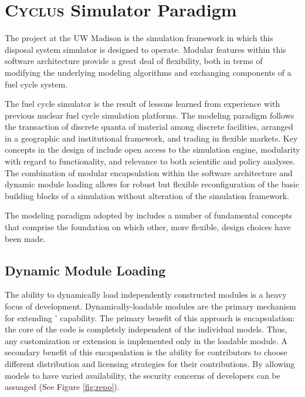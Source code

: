\section{\textsc{Cyclus} Simulator Paradigm }

The \Cyclus project \cite{wilson_cyclus:_2012} at the \gls{UW} Madison is the 
simulation framework in which this disposal system simulator is designed to 
operate.  Modular features within this software architecture provide a 
great deal of flexibility, both in terms of modifying the underlying 
modeling algorithms and exchanging components of a fuel cycle system.

The \Cyclus fuel cycle simulator is the  result of lessons learned 
from experience with previous nuclear fuel cycle simulation platforms.  
The modeling paradigm follows the transaction of discrete quanta of 
material among discrete facilities, arranged in a geographic and 
institutional framework, and trading in
flexible markets. Key concepts in the design of \Cyclus include open
access to the simulation engine, modularity with regard to
functionality, and relevance to both scientific and policy
analyses. The combination of modular encapsulation within the
software architecture and dynamic module loading allows for robust but 
flexible reconfiguration of the basic building blocks of a simulation 
without alteration of the simulation framework.  

The modeling paradigm adopted by \Cyclus includes a number of
fundamental concepts that comprise the foundation on which other, more
flexible, design choices have been made. 

\subsection{Dynamic Module Loading}

The ability to dynamically load independently constructed modules is a
heavy focus of \Cyclus development. Dynamically-loadable modules are
the primary mechanism for extending \Cyclus' capability. The primary
benefit of this approach is encapsulation: the core of the code is
completely independent of the individual models. Thus, any
customization or extension is implemented only in the loadable
module. A secondary benefit of this encapsulation is the ability for
contributors to choose different distribution and licensing strategies
for their contributions. By allowing models to have varied
availability, the security concerns of developers can be
assuaged (See Figure \ref{fig:repo}). 


